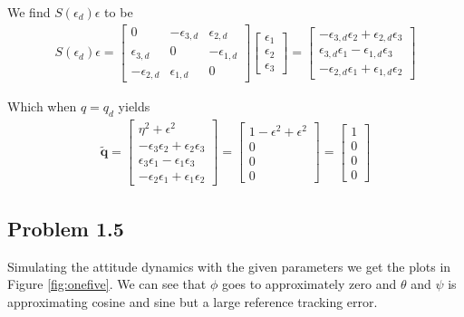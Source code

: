  We find $S(\epsilon_d)\epsilon$ to be
 \begin{align}
     S(\epsilon_d)\epsilon = 
     \begin{bmatrix}
         0 & -\epsilon_{3,d} & \epsilon_{2,d} \\
         \epsilon_{3,d} & 0 & -\epsilon_{1,d} \\
         -\epsilon_{2,d} & \epsilon_{1,d} & 0 
     \end{bmatrix}
     \begin{bmatrix}
         \epsilon_1 \\
         \epsilon_2 \\
         \epsilon_3
     \end{bmatrix}
     = 
    \begin{bmatrix}
        -\epsilon_{3,d}\epsilon_{2} + \epsilon_{2,d}\epsilon_{3} \\
        \epsilon_{3,d}\epsilon_{1} - \epsilon_{1,d}\epsilon_{3} \\
        -\epsilon_{2,d}\epsilon_{1} + \epsilon_{1,d}\epsilon_{2}
    \end{bmatrix}
 \end{align}

Which when $q=q_d$ yields 
\begin{align}
    \boldsymbol{\tilde{q}} = 
    \begin{bmatrix}
        \eta^2 + \epsilon^2 \\
        -\epsilon_{3}\epsilon_{2} + \epsilon_{2}\epsilon_{3} \\
        \epsilon_{3}\epsilon_{1} -\epsilon_{1}\epsilon_{3} \\
        -\epsilon_{2}\epsilon_{1} + \epsilon_{1}\epsilon_{2}
    \end{bmatrix}
    = 
    \begin{bmatrix}
       1- \epsilon^2+ \epsilon^2 \\
        0 \\
        0 \\
        0
    \end{bmatrix}
    =
    \begin{bmatrix}
        1 \\
        0 \\
        0 \\
        0
    \end{bmatrix}
\end{align}
\subsection*{Problem 1.5}
Simulating the attitude dynamics with the given parameters we get the plots in Figure \ref{fig:onefive}. We can see that $\phi$ goes to approximately zero and $\theta$ and $\psi$ is approximating cosine and sine but a large reference tracking error. 

